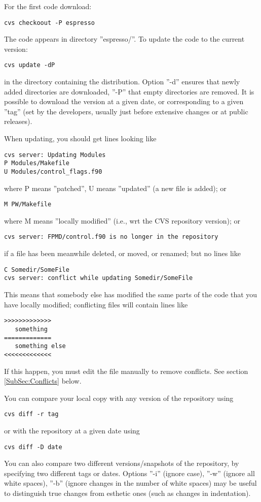\documentclass[12pt,a4paper]{article}
\begin{document}
For the first code download:
\begin{verbatim}
cvs checkoout -P espresso
\end{verbatim}
The code appears in directory ''espresso/''. To update the code to the
current version: 
\begin{verbatim}
cvs update -dP
\end{verbatim}
in the directory containing the distribution. Option ''-d'' ensures
that newly added directories are downloaded, ''-P'' that empty
directories are removed.  It is possible to download the version at a
given date, or corresponding to  a given ''tag''  (set by the
developers, usually just before extensive changes or at public
releases). 

When updating, you should get lines looking like
\begin{verbatim}
cvs server: Updating Modules
P Modules/Makefile
U Modules/control_flags.f90
\end{verbatim}
where P means ''patched'', U means ''updated'' (a new file is added); or
\begin{verbatim}
M PW/Makefile
\end{verbatim}
where M means ''locally modified'' (i.e., wrt the CVS repository
version); or
\begin{verbatim}
cvs server: FPMD/control.f90 is no longer in the repository
\end{verbatim}
if a file has been meanwhile deleted, or moved, or renamed; but no lines like
\begin{verbatim}
C Somedir/SomeFile
cvs server: conflict while updating Somedir/SomeFile
\end{verbatim}
This means that somebody else has modified the same parts of the code
that you have locally modified; conflicting files will contain lines
like 
\begin{verbatim}
>>>>>>>>>>>>>
   something
=============
   something else
<<<<<<<<<<<<<
\end{verbatim}
If this happen, you must edit the file manually to remove conflicts. See section \ref{SubSec:Conflicts}
below.

You can compare your local copy with any version of the repository
using
\begin{verbatim}
cvs diff -r tag
\end{verbatim}
or with the repository at a given date using
\begin{verbatim}
cvs diff -D date
\end{verbatim}
You can also compare two different versions/snapshots of the
repository, by specifying two different tags or dates. Options ''-i''
(ignore case), ''-w'' (ignore all white spaces), ''-b'' (ignore
changes in the number of white spaces) may be useful to distinguish
true changes from esthetic ones (such as changes in indentation). 
\end{document}
